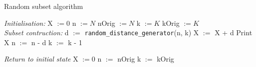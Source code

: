\begin{algorithm}
	\caption{Random subset algorithm}
	\begin{algorithmic}[1]
			\BState \textit{Initialisation:}
				\State X $ := 0$
				\State n $:= N$ 
				\State nOrig $:= N$ 
				\State k $:= K$ 
				\State kOrig $:= K$\\ 
			
			\BState \textit{Subset contruction:}
					\State d $:=$ \verb|random_distance_generator|(n, k)
					\State X $:=$ X + d
					\State Print X
					\State n $:=$ n - d  
					\State k $:=$ k - 1\\
				\EndFor
			
			\BState \textit{Return to initial state}
				\State X $:= 0$
				\State n $:=$ nOrig
				\State k $:=$ kOrig
	\end{algorithmic}
\end{algorithm}